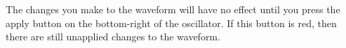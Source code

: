 \begin{tcolorbox}[colback=yellow!10!white,
        colframe=white!20!black,
        center,
        valign=top,
        halign=left,
        center title,
        width=\textwidth]

    The changes you make to the waveform will have no effect until you press the apply button on the bottom-right of the oscillator. If this button is red, then there are still unapplied changes to the waveform.
\end{tcolorbox}